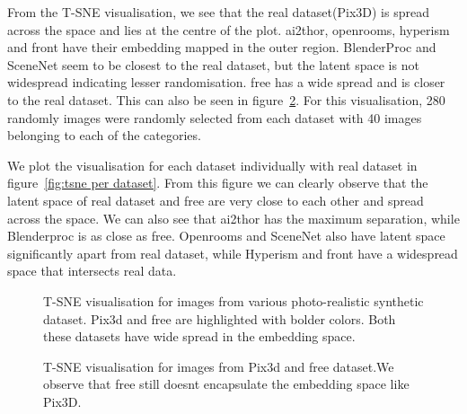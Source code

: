 From the T-SNE visualisation, we see that the real dataset(Pix3D) is spread across the space and lies at the centre of the plot.
\gls{ai2thor}, openrooms, hyperism and \gls{front} have their embedding mapped in the outer region.
BlenderProc and SceneNet seem to be closest to the real dataset, but the latent space is not widespread indicating lesser randomisation.
\gls{free} has a wide spread and is closer to the real dataset.
This can also be seen in figure~\ref{fig:pix3d_s2r3dfree}.
For this visualisation, 280 randomly images were randomly selected from each dataset with 40 images belonging to each of the categories.

We plot the visualisation for each dataset individually with real dataset in figure~\ref{fig:tsne per dataset}.
From this figure we can clearly observe that the latent space of real dataset and \gls{free} are very close to each other and spread across the space.
We can also see that \gls{ai2thor} has the maximum separation, while Blenderproc is as close as \gls{free}.
Openrooms and SceneNet also have latent space significantly apart from real dataset, while Hyperism and \gls{front} have a widespread space that intersects real data.

\begin{figure}
    \centering
    \resizebox{\textwidth}{10cm}{}
    \caption{T-SNE visualisation for images from various photo-realistic synthetic dataset. Pix3d and \gls{free} are highlighted with bolder colors.
    Both these datasets have wide spread in the embedding space.}
    \label{fig:photorealistic tsne}
\end{figure}

\begin{figure}
    \centering
    \resizebox{\textwidth}{10cm}{}
    \caption{T-SNE visualisation for images from Pix3d and \gls{free} dataset.We observe that \gls{free} still doesnt encapsulate the embedding space like Pix3D.}
    \label{fig:pix3d_s2r3dfree}
\end{figure}

